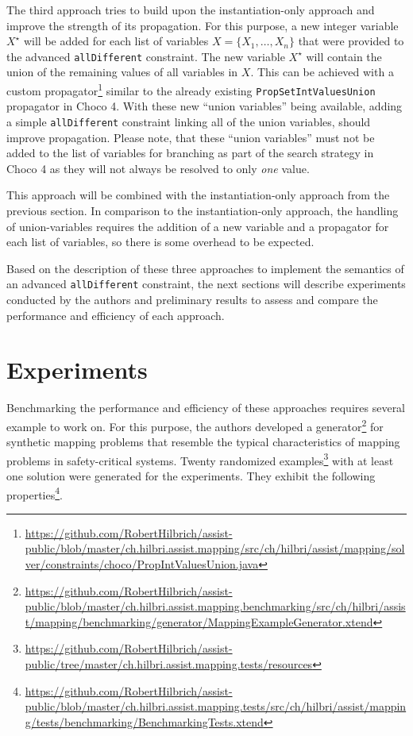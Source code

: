 \documentclass[english,biblatex]{lni}
\begin{document}
The third approach tries to build upon the instantiation-only approach and improve the strength of its propagation.
For this purpose, a new integer variable $X^\star$ will be added for each list of variables $X = \{X_1, \dots, X_n\}$ that were provided to the advanced \texttt{allDifferent} constraint.
The new variable $X^\star$ will contain the union of the remaining values of all variables in $X$.
This can be achieved with a custom propagator\footnote{\url{https://github.com/RobertHilbrich/assist-public/blob/master/ch.hilbri.assist.mapping/src/ch/hilbri/assist/mapping/solver/constraints/choco/PropIntValuesUnion.java}} similar to the already existing \texttt{PropSetIntValuesUnion} propagator in Choco 4.
With these new ``union variables'' being available, adding a simple \texttt{allDifferent} constraint linking all of the union variables, should improve propagation.
Please note, that these ``union variables'' must not be added to the list of variables for branching as part of the search strategy in Choco 4 as they will not always be resolved to only \emph{one} value.

This approach will be combined with the instantiation-only approach from the previous section.
In comparison to the instantiation-only approach, the handling of union-variables requires the addition of a new variable and a propagator for each list of variables, so there is some overhead to be expected.

Based on the description of these three approaches to implement the semantics of an advanced \texttt{allDifferent} constraint, the next sections will describe experiments conducted by the authors and preliminary results to assess and compare the performance and efficiency of each approach.

\section{Experiments}

Benchmarking the performance and efficiency of these approaches requires several example to work on.
For this purpose, the authors developed a generator\footnote{\url{https://github.com/RobertHilbrich/assist-public/blob/master/ch.hilbri.assist.mapping.benchmarking/src/ch/hilbri/assist/mapping/benchmarking/generator/MappingExampleGenerator.xtend}} for synthetic mapping problems that resemble the typical characteristics of mapping problems in safety-critical systems.
Twenty randomized examples\footnote{\url{https://github.com/RobertHilbrich/assist-public/tree/master/ch.hilbri.assist.mapping.tests/resources}} with at least one solution were generated for the experiments.
They exhibit the following properties\footnote{\url{https://github.com/RobertHilbrich/assist-public/blob/master/ch.hilbri.assist.mapping.tests/src/ch/hilbri/assist/mapping/tests/benchmarking/BenchmarkingTests.xtend}}.
\end{document}
